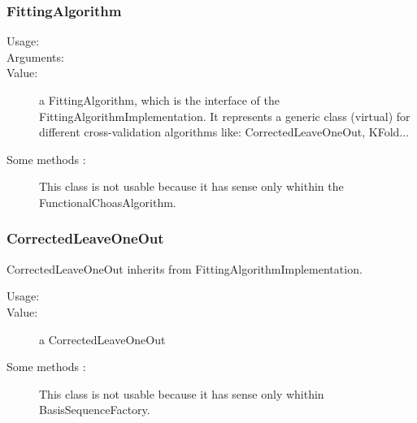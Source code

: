\subsubsection{FittingAlgorithm}

\begin{description}
\item[Usage:] \strut
{}

\item[Arguments:]  \strut
{}

\item[Value:]  a FittingAlgorithm, which is the interface of the FittingAlgorithmImplementation. It represents a generic class (virtual) for different cross-validation algorithms like: CorrectedLeaveOneOut, KFold...

\item[Some methods :]  This class is not usable because it has sense only whithin the FunctionalChoasAlgorithm.

\end{description}

\subsubsection{CorrectedLeaveOneOut}

CorrectedLeaveOneOut inherits from FittingAlgorithmImplementation.

\begin{description}
\item[Usage:] \strut
{}

\item[Value:] a CorrectedLeaveOneOut

\item[Some methods :] This class is not usable because it has sense only whithin BasisSequenceFactory.

\end{description}

